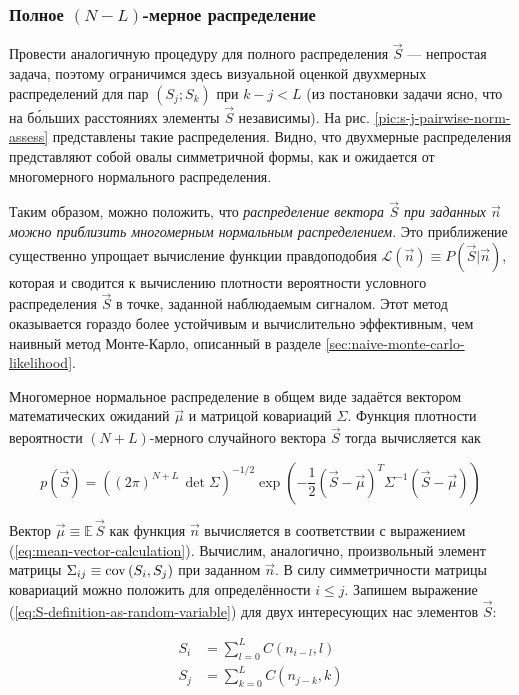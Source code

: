\subsubsection{Полное $(N-L)$-мерное распределение}
Провести аналогичную процедуру для полного распределения $\vec{S}$ --- непростая задача, поэтому ограничимся здесь визуальной оценкой двухмерных распределений для пар $(S_j; S_k)$ при $k - j < L$ (из постановки задачи ясно, что на б\'{о}льших расстояниях элементы $\vec{S}$ независимы). На рис. \ref{pic:s-j-pairwise-norm-assess} представлены такие распределения. Видно, что двухмерные распределения представляют собой овалы симметричной формы, как и ожидается от многомерного нормального распределения.

Таким образом, можно положить, что \textit{распределение вектора $\vec{S}$ при заданных $\vec{n}$ можно приблизить многомерным нормальным распределением}. Это приближение существенно упрощает вычисление функции правдоподобия $\mathcal{L}(\vec{n}) \equiv P(\vec{S} | \vec{n})$, которая и сводится к вычислению плотности вероятности условного распределения $\vec{S}$ в точке, заданной наблюдаемым сигналом. Этот метод оказывается гораздо более устойчивым и вычислительно эффективным, чем наивный метод Монте-Карло, описанный в разделе \ref{sec:naive-monte-carlo-likelihood}.

Многомерное нормальное распределение в общем виде задаётся вектором математических ожиданий $\vec{\mu}$ и матрицой ковариаций $\Sigma$. Функция плотности вероятности $(N+L)$-мерного случайного вектора $\vec{S}$ тогда вычисляется как

\begin{equation}
	\label{eq:multivariate-normal-density}
	p(\vec{S}) = \left( (2 \pi)^{N+L} \, \det \Sigma \right)^{-1/2} \exp \left( - \frac{1}{2} (\vec{S} - \vec{\mu})^T \Sigma^{-1} (\vec{S} - \vec{\mu}) \right)
\end{equation}

Вектор $\vec{\mu} \equiv \mathbb{E} \, \vec{S}$ как функция $\vec{n}$ вычисляется в соответствии с выражением (\ref{eq:mean-vector-calculation}). Вычислим, аналогично, произвольный элемент матрицы $\Sigma_{ij} \equiv \mathrm{cov}\left( S_i, S_j \right)$ при заданном $\vec{n}$. В силу симметричности матрицы ковариаций можно положить для определённости $i \le j$. Запишем выражение (\ref{eq:S-definition-as-random-variable}) для двух интересующих нас элементов $\vec{S}$:

\begin{align}
	S_i &= \sum_{l=0}^{L} C(n_{i-l}, l)\\
	S_j &= \sum_{k=0}^{L} C(n_{j-k}, k)
\end{align}

